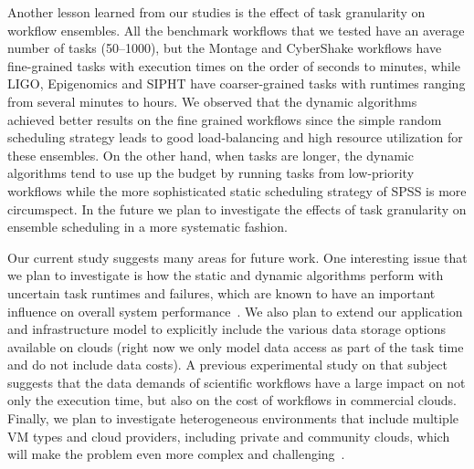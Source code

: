\documentclass{sig-alternate}
\begin{document}
Another lesson learned from our studies is the effect of task granularity on 
workflow ensembles. All the benchmark workflows that we tested have an average 
number of tasks (50--1000), but the Montage and CyberShake workflows have 
fine-grained tasks with execution times on the order of seconds to minutes, 
while LIGO, Epigenomics and SIPHT have coarser-grained tasks with runtimes 
ranging from several minutes to hours. We observed that the dynamic 
algorithms achieved better results on the fine grained workflows since the 
simple random scheduling strategy leads to good load-balancing and high 
resource utilization for these ensembles. On the other hand, when tasks are
longer, the dynamic algorithms tend to use up the budget by running tasks 
from low-priority workflows while the more sophisticated static scheduling 
strategy of SPSS is more circumspect. In the future we plan to investigate 
the effects of task granularity on ensemble scheduling in a more systematic
fashion.

Our current study suggests many areas for future work. One interesting
issue that we plan to investigate is how the static and dynamic algorithms 
perform with uncertain task runtimes and failures, which are known to have 
an important influence on overall system performance~\cite{Sakellariou2010,Dongarra2007}. 
We also plan to extend our application and infrastructure model to explicitly 
include the various data storage options available on clouds (right now we only 
model data access as part of the task time and do not include data costs). A previous 
experimental study on that subject~\cite{Juve2010} suggests that the data 
demands of scientific workflows have a large impact on not only the 
execution time, but also on the cost of workflows in commercial clouds. 
Finally, we plan to investigate heterogeneous environments that include 
multiple VM types and cloud providers, including private and community clouds, 
which will make the problem even more complex and challenging~\cite{Marshall2010,vockler11,Juve2010}.







\end{document}
